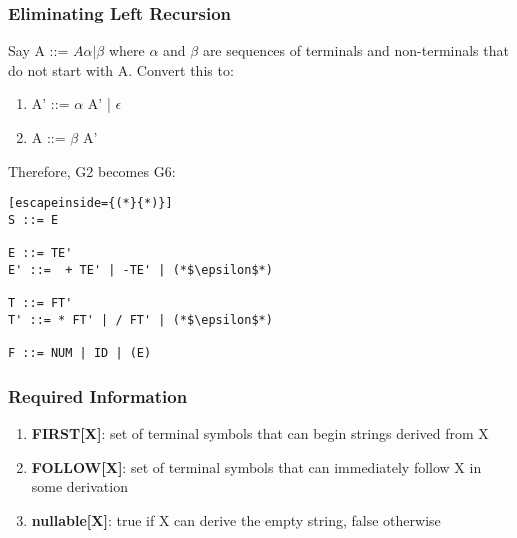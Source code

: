 \documentclass{article}
\begin{document}
\subsubsection{Eliminating Left Recursion}
Say A ::= $A\alpha | \beta$ where $\alpha$ and $\beta$ are sequences of terminals and non-terminals that do not start with A. Convert this to:
\begin{enumerate}
	\item A' ::= $\alpha$ A' | $\epsilon$
	\item A ::= $\beta$ A'
\end{enumerate}

\noindent
Therefore, G2 becomes G6:
\begin{lstlisting}[escapeinside={(*}{*)}]
S ::= E

E ::= TE'
E' ::=  + TE' | -TE' | (*$\epsilon$*)

T ::= FT'
T' ::= * FT' | / FT' | (*$\epsilon$*)

F ::= NUM | ID | (E)
\end{lstlisting}

\subsubsection{Required Information}
\begin{enumerate}
	\item \textbf{FIRST[X]}: set of terminal symbols that can begin strings derived from X
	\item \textbf{FOLLOW[X]}: set of terminal symbols that can immediately follow X in some derivation
	\item \textbf{nullable[X]}: true if X can derive the empty string, false otherwise
\end{enumerate}
\end{document}
